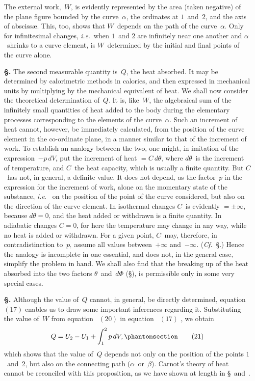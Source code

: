 \documentclass[12pt]{book}[2005/09/16]
\newcommand{\Section}[1]{
  \medskip\par\textbf{§\;#1}
  \label{section:#1}
}
\newcommand{\SecNum}[1]{\hyperref[section:#1.]{{\upshape #1}}}
\newcommand{\SecRef}[2][§\;]{\hyperref[section:#2.]{{\upshape #1#2}}}
\newcommand{\Tag}[1]{%
  \phantomsection\label{eqn:#1}\tag*{\ensuremath{#1}}%
}
\newcommand{\Eq}[1]{%
  \hyperref[eqn:#1]{\ensuremath{#1}}%
}
\newcommand{\PageSep}[1]{\ignorespaces}
\newcommand{\ie}{\emph{i.e.}}
\newcommand{\Cf}{\emph{Cf.}}
\begin{document}
The external work,~$W$, is evidently represented by the
area (taken negative) of the plane figure bounded by the
curve~$\alpha$, the ordinates at $1$~and~$2$, and the axis of abscissæ.
This, too, shows that $W$~depends on the path of the curve~$\alpha$.
Only for infinitesimal changes, \ie\ when $1$~and $2$ are
infinitely near one another and $\alpha$~shrinks to a curve element,
is $W$~determined by the initial and final points of the
curve alone.

\Section{76.} The second measurable quantity is~$Q$, the heat
%
%
%
absorbed. It may be determined by calorimetric methods
in calories, and then expressed in mechanical units by multiplying
by the mechanical equivalent of heat. We shall
now consider the theoretical determination of~$Q$. It is, like~$W$,
the algebraical sum of the infinitely small quantities of
heat added to the body during the elementary processes
corresponding to the elements of the curve~$\alpha$. Such an
increment of heat cannot, however, be immediately calculated,
from the position of the curve element in the co-ordinate
plane, in a manner similar to that of the increment of work.
To establish an analogy between the two, one might, in
imitation of the expression~$-p\, dV$, put the increment of
heat $= C\, d\theta$, where $d\theta$~is the increment of temperature, and
$C$~the heat capacity, which is usually a finite quantity.
But $C$~has not, in general, a definite value. It does not
depend, as the factor~$p$ in the expression for the increment
of work, alone on the momentary state of the substance, \ie\
\PageSep{54}
%
on the position of the point of the curve considered, but
also on the direction of the curve element. In isothermal
changes $C$~is evidently $= \pm\infty$, because $d\theta = 0$, and the
heat added or withdrawn is a finite quantity. In adiabatic
changes $C = 0$, for here the temperature may change in
any way, while no heat is added or withdrawn. For a given
point, $C$~may, therefore, in contradistinction to~$p$, assume
all values between~$+\infty$ and~$-\infty$. (\Cf~\SecRef{47}.) Hence the
analogy is incomplete in one essential, and does not, in the
general case, simplify the problem in hand. We shall also
find that the breaking up of the heat absorbed into the two
factors $\theta$~and~$d\Phi$ (\SecRef{120}), is permissible only in some very
special cases.

\Section{77.} Although the value of~$Q$ cannot, in general, be
directly determined, equation~\Eq{(17)} enables us to draw some
important inferences regarding it. Substituting the value
of~$W$ from equation~\Eq{(20)} in equation~\Eq{(17)}, we obtain
\[
Q = U_{2} - U_{1} + \int_{1}^{2} p\, dV,
\Tag{(21)}
\]
which shows that the value of~$Q$ depends not only on the
position of the points $1$~and~$2$, but also on the connecting
path ($\alpha$~or~$\beta$). Carnot's theory of heat cannot be reconciled
with this proposition, as we have shown at length in
\SecRef{51}~and~\SecNum{52}.
\end{document}
